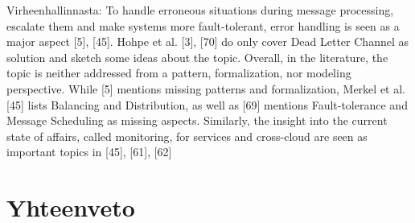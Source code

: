 Virheenhallinnasta:
To handle erroneous situations during message processing, escalate them and make systems more fault-tolerant, error handling is seen as a major aspect [5], [45]. Hohpe et al. [3], [70] do only cover Dead Letter Channel as solution and sketch some ideas about the topic. Overall, in the literature, the topic is neither addressed from a pattern, formalization, nor modeling perspective. While [5] mentions missing patterns and formalization, Merkel et al. [45] lists Balancing and Distribution, as well as [69] mentions Fault-tolerance and Message Scheduling as missing aspects. Similarly, the insight into the current state of affairs, called monitoring, for services and cross-cloud are seen as important topics in [45], [61], [62]\citep{Ritter2017}




\chapter{Yhteenveto}
